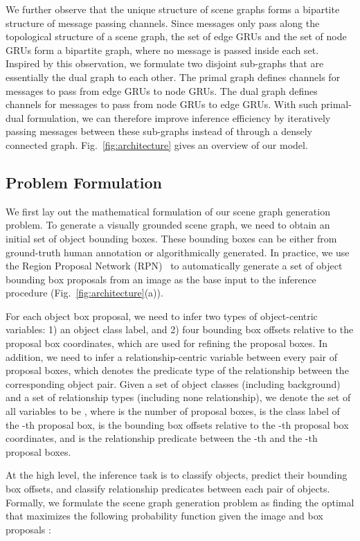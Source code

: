 \documentclass[10pt,twocolumn,letterpaper]{article}
\begin{document}
We further observe that the unique structure of scene graphs forms a bipartite structure of message passing channels. Since messages only pass along the topological structure of a scene graph, the set of edge GRUs and the set of node GRUs form a bipartite graph, where no message is passed inside each set.
Inspired by this observation, we formulate two disjoint sub-graphs that are essentially the dual graph to each other. 
The primal graph defines channels for messages to pass from edge GRUs to node GRUs.
The dual graph defines channels for messages to pass from node GRUs to edge GRUs.
With such primal-dual formulation, we can therefore improve inference efficiency by iteratively passing messages between these sub-graphs instead of through a densely connected graph. Fig.~\ref{fig:architecture} gives an overview of our model.
 


\subsection{Problem Formulation}
We first lay out the mathematical formulation of our scene graph generation problem. To generate a visually grounded scene graph, we need to obtain an initial set of object bounding boxes. These bounding boxes can be either from ground-truth human annotation or algorithmically generated. In practice, we use the Region Proposal Network (RPN)~\cite{renNIPS15fasterrcnn} to automatically generate a set of object bounding
box proposals  from an image  as the base input to the inference procedure (Fig.~\ref{fig:architecture}(a)). 

For each object box proposal, we need to infer two types of object-centric variables: 1) an object class label, and 2) four bounding box offsets relative to the proposal box coordinates, which are used for refining the proposal boxes. In addition, we need to infer a relationship-centric variable between every pair of proposal boxes, which denotes the predicate type of the relationship between the corresponding object pair. Given a set of object classes  (including background) and
a set of relationship types  (including none relationship), 
we denote the set of all variables to be , where  is the number of proposal boxes,  is the class label of the -th proposal box,  is the bounding box offsets relative to the -th proposal box coordinates, and 
  is the relationship predicate between the -th and the -th proposal boxes.


At the high level, the inference task is to classify objects, predict their bounding box offsets, and classify relationship predicates between each pair of objects.  Formally, we formulate the scene graph generation 
problem as finding the optimal  that maximizes the following probability function given the image  and box proposals :
\end{document}

